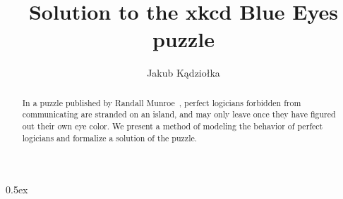 \documentclass[11pt,a4paper]{article}
\begin{document}
\title{Solution to the xkcd Blue Eyes puzzle}
\author{Jakub Kądziołka}
\maketitle

\begin{abstract}
    In a puzzle published by Randall Munroe~\cite{xkcd}, perfect logicians forbidden
    from communicating are stranded on an island, and may only leave once they
    have figured out their own eye color. We present a method of modeling the
    behavior of perfect logicians and formalize a solution of the puzzle.
\end{abstract}

\tableofcontents

\parindent 0pt\parskip 0.5ex





\end{document}
